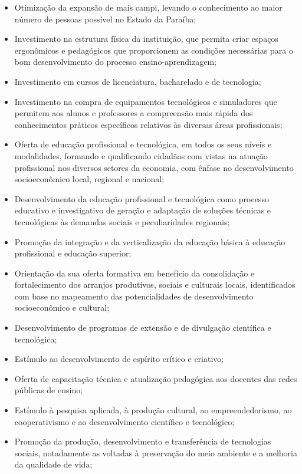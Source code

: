 \begin{itemize}
  \item Otimização da expansão de mais campi, levando o conhecimento ao maior número de pessoas possível no Estado da Paraíba;
  \item Investimento na estrutura física da instituição, que permita criar espaços ergonômicos e pedagógicos que proporcionem as condições necessárias para o bom desenvolvimento do processo ensino-aprendizagem;
  \item Investimento em cursos de licenciatura, bacharelado e de tecnologia;
  \item Investimento na compra de equipamentos tecnológicos e simuladores que permitem aos alunos e professores a compreensão mais rápida dos conhecimentos práticos específicos relativos às diversas áreas profissionais;
  \item Oferta de educação profissional e tecnológica, em todos os seus níveis e modalidades, formando e qualificando cidadãos com vistas na atuação profissional nos diversos setores da economia, com ênfase no desenvolvimento socioeconômico local, regional e nacional;
  \item Desenvolvimento da educação profissional e tecnológica como processo educativo e investigativo de geração e adaptação de soluções técnicas e tecnológicas às demandas sociais e peculiaridades regionais;
  \item Promoção da integração e da verticalização da educação básica à educação profissional e educação superior;
  \item Orientação da sua oferta formativa em benefício da consolidação e fortalecimento dos arranjos produtivos, sociais e culturais locais, identificados com base no mapeamento das potencialidades de desenvolvimento socioeconômico e cultural;
  \item Desenvolvimento de programas de extensão e de divulgação científica e tecnológica;
  \item Estímulo ao desenvolvimento de espírito crítico e criativo;
  \item Oferta de capacitação técnica e atualização pedagógica aos docentes das redes públicas de ensino;
  \item Estímulo à pesquisa aplicada, à produção cultural, ao empreendedorismo, ao cooperativismo e ao desenvolvimento científico e tecnológico;
  \item Promoção da produção, desenvolvimento e transferência de tecnologias sociais, notadamente as voltadas à preservação do meio ambiente e a melhoria da qualidade de vida;

\end{itemize}
